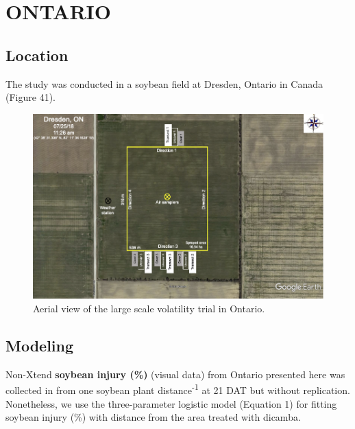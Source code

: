 \documentclass[]{article}
\begin{document}
\newpage

\pagebreak

\section{ONTARIO}\label{ontario-1}

\subsection{Location}\label{location-4}

The study was conducted in a soybean field at Dresden, Ontario in Canada
(Figure 41).

\begin{figure}[h]

{\centering \includegraphics[width=1\linewidth]{Ontario} 

}

\caption{Aerial view of the large scale volatility trial in Ontario.}\label{fig:unnamed-chunk-86}
\end{figure}

\pagebreak

\subsection{Modeling}\label{modeling-4}

Non-Xtend \textbf{soybean injury (\%)} (visual data) from Ontario
presented here was collected in from one soybean plant
distance\textsuperscript{-1} at 21 DAT but without replication.
Nonetheless, we use the three-parameter logistic model (Equation 1) for
fitting soybean injury (\%) with distance from the area treated with
dicamba.
\end{document}
